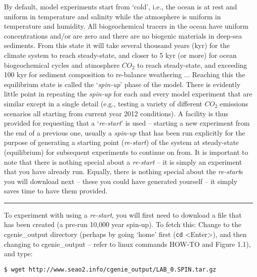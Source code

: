 \documentclass[11pt,fleqn]{book} %
\begin{document}
By default, model experiments start from ‘cold’, i.e., the ocean is at rest and uniform in temperature and salinity while the atmosphere is uniform in temperature and humidity. All biogeochemical tracers in the ocean have uniform concentrations and/or are zero and there are no biogenic materials in deep-sea sediments. From this state it will take several thousand years (kyr) for the climate system to reach steady-state, and closer to 5 kyr (or more) for ocean biogeochemical cycles and atmosphere \(CO_{2}\) to reach steady-state, and exceeding 100 kyr for sediment composition to re-balance weathering ... Reaching this the equilibrium state is called the ‘\textit{spin-up}’ phase of the model.
There is evidently little point in repeating the \textit{spin-up} for each and every model experiment that are similar except in a single detail (e.g., testing a variety of different \(CO_{2}\) emissions scenarios all starting from current year 2012 conditions). A facility is thus provided for requesting that a ‘\textit{re-start}’ is used – starting a new experiment from the end of a previous one, usually a \textit{spin-up} that has been run explicitly for the purpose of generating a starting point (\textit{re-start}) of the system at steady-state (equilibrium) for subsequent experiments to continue on from.
It is important to note that there is nothing special about a \textit{re-start} – it is simply an experiment that you have already run. Equally, there is nothing special about the \textit{re-start}s you will download next – these you could have generated yourself – it simply saves time to have them provided.

\vspace{1mm}
\noindent\rule{4cm}{0.1mm}
\vspace{2mm}

\noindent To experiment with using a \textit{re-start}, you will first need to download a file that has been created (a pre-run 10,000 year spin-up). To fetch this: Change to the \textsf{\footnotesize cgenie\_output} directory (perhaps by going ‘home’ first (\texttt{cd} \textsf{\small <Enter>}), and then changing to \textsf{\footnotesize cgenie\_output} – refer to linux commands HOW-TO and Figure 1.1), and type:

\vspace{-2mm}
\begin{verbatim}
$ wget http://www.seao2.info/cgenie_output/LAB_0.SPIN.tar.gz
\end{verbatim}
\vspace{-2mm}
\end{document}

